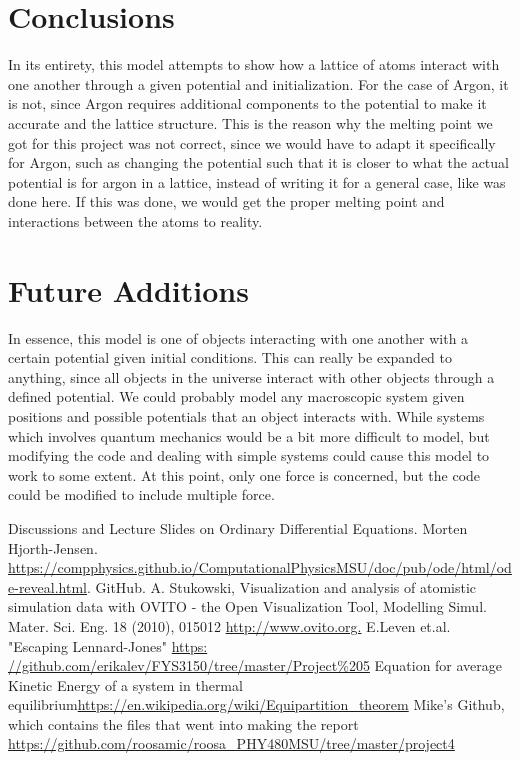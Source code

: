 \documentclass[11pt,twocolumn]{article}
\begin{document}
\section{Conclusions}
In its entirety, this model attempts to show how a lattice of atoms interact with one another through a given potential and initialization. For the case of Argon, it is not, since Argon requires additional components to the potential to make it accurate and the lattice structure. This is the reason why the melting point we got for this project was not correct, since we would have to adapt it specifically for Argon, such as changing the potential such that it is closer to what the actual potential is for argon in a lattice, instead of writing it for a general case, like was done here. If this was done, we would get the proper melting point and interactions between the atoms to reality.

\section{Future Additions}
In essence, this model is one of objects interacting with one another with a certain potential given initial conditions. This can really be expanded to anything, since all objects in the universe interact with other objects through a defined potential. We could probably model any macroscopic system given positions and possible potentials that an object interacts with. While systems which involves quantum mechanics would be a bit more difficult to model, but modifying the code and dealing with simple systems could cause this model to work to some extent. At this point, only one force is concerned, but the code could be modified to include multiple force.

\begin{thebibliography}{1}
 Discussions and Lecture Slides on Ordinary Differential Equations. Morten Hjorth-Jensen. \url{https://compphysics.github.io/ComputationalPhysicsMSU/doc/pub/ode/html/ode-reveal.html}. GitHub. 
A. Stukowski, Visualization and analysis of atomistic simulation data with OVITO - the Open
Visualization Tool, Modelling Simul. Mater. Sci. Eng. 18 (2010), 015012 
\url{http://www.ovito.org.}
E.Leven et.al. "Escaping Lennard-Jones"
\url{https:
//github.com/erikalev/FYS3150/tree/master/Project%
Equation for average Kinetic Energy of a system in thermal equilibrium\url{https://en.wikipedia.org/wiki/Equipartition_theorem}
Mike's Github, which contains the files that went into making the report \url{https://github.com/roosamic/roosa_PHY480MSU/tree/master/project4}
\end{thebibliography}
\end{document}
